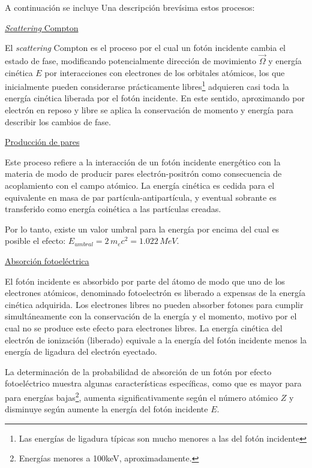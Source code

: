 A continuaci\'on se incluye Una descripci\'on brev\'isima estos procesos:

\begin{center}
\underline{\textit{Scattering} Compton}
\end{center}

El \textit{scattering} Compton es el proceso por el cual un fot\'on incidente cambia el estado de fase, modificando potencialmente 
direcci\'on de movimiento $\vec{\Omega}$ y energ\'ia cin\'etica $E$ por interacciones con electrones de los orbitales at\'omicos, los que 
inicialmente pueden considerarse pr\'acticamente libres\footnote{Las energ\'ias de ligadura t\'ipicas son mucho menores a 
las del fot\'on incidente} adquieren casi toda la energ\'ia cin\'etica liberada por el fot\'on incidente. En este sentido, aproximando por 
electr\'on en reposo y libre se aplica la conservaci\'on de momento y energ\'ia para describir los cambios de fase.
%

%
\begin{center}
\underline{Producci\'on de pares}
\end{center}

Este proceso refiere a la interacci\'on de un fot\'on incidente energ\'etico con la materia de modo de producir pares electr\'on-positr\'on
como consecuencia de acoplamiento con el campo at\'omico. La energ\'ia cin\'etica es cedida para el equivalente en masa de par 
part\'icula-antipart\'icula, y eventual sobrante es transferido como energ\'ia coin\'etica a las part\'iculas creadas.
%

%
Por lo tanto, existe un valor umbral para la energ\'ia por encima del cual es posible el efecto: 
$E_{umbral} = 2 \, m_{e} c^{2} = 1.022 \, MeV$.

\begin{center}
\underline{Absorci\'on fotoel\'ectrica}
\end{center}

El fot\'on incidente es absorbido por parte del \'atomo de modo que uno de los electrones at\'omicos, denominado fotoelectr\'on es 
liberado a expensas de la energ\'ia cin\'etica adquirida. Los electrones libres no pueden absorber fotones para cumplir simult\'aneamente 
con la conservaci\'on de la energ\'ia y el momento, motivo por el cual no se produce este efecto para electrones libres. La energ\'ia 
cin\'etica del electr\'on de ionizaci\'on (liberado) equivale a la energ\'ia del fot\'on incidente menos la energ\'ia de ligadura del 
electr\'on eyectado.
%

%
La determinaci\'on de la probabilidad de absorci\'on de un fot\'on por efecto fotoel\'ectrico muestra algunas caracter\'isticas 
espec\'ificas, como que es mayor para para energ\'ias bajas\footnote{Energ\'ias menores a 100keV, aproximadamente.}, aumenta 
significativamente seg\'un el n\'umero at\'omico $Z$ y disminuye seg\'un aumente la energ\'ia del fot\'on incidente $E$.
%


